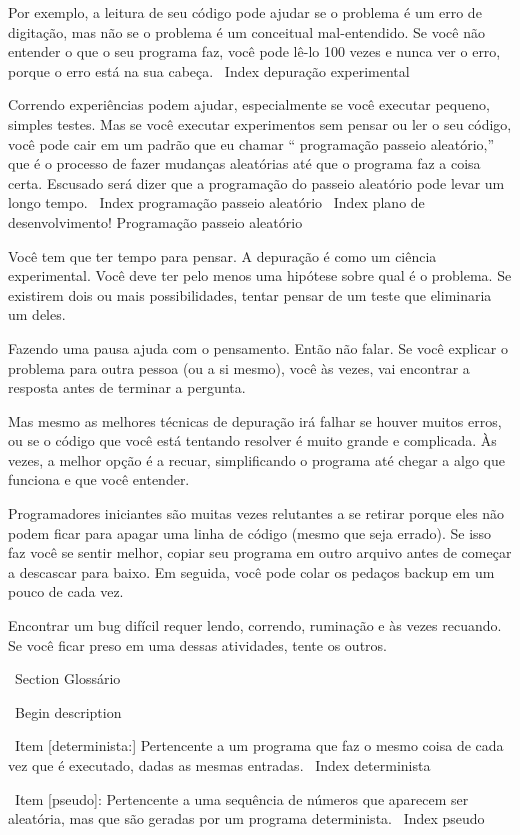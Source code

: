 \documentclass[10pt]{book}
\begin{document}
{{{{{{{{{{Por exemplo, a leitura de seu código pode ajudar se o problema é um
erro de digitação, mas não se o problema é um conceitual
mal-entendido. Se você não entender o que o seu programa faz, você
pode lê-lo 100 vezes e nunca ver o erro, porque o erro está na
sua cabeça.
\ Index {depuração experimental}

Correndo experiências podem ajudar, especialmente se você executar pequeno, simples
testes. Mas se você executar experimentos sem pensar ou ler o seu
código, você pode cair em um padrão que eu chamar `` programação passeio aleatório,''
que é o processo de fazer mudanças aleatórias até que o programa
faz a coisa certa. Escusado será dizer que a programação do passeio aleatório
pode levar um longo tempo.
\ Index {programação passeio aleatório}
\ Index {plano de desenvolvimento! Programação passeio aleatório}

Você tem que ter tempo para pensar. A depuração é como um
ciência experimental. Você deve ter pelo menos uma hipótese sobre
qual é o problema. Se existirem dois ou mais possibilidades, tentar
pensar de um teste que eliminaria um deles.

Fazendo uma pausa ajuda com o pensamento. Então não falar.
Se você explicar o problema para outra pessoa (ou a si mesmo), você
às vezes, vai encontrar a resposta antes de terminar a pergunta.

Mas mesmo as melhores técnicas de depuração irá falhar se houver muitos
erros, ou se o código que você está tentando resolver é muito grande e
complicada. Às vezes, a melhor opção é a recuar, simplificando o
programa até chegar a algo que funciona e que você
entender.

Programadores iniciantes são muitas vezes relutantes a se retirar porque
eles não podem ficar para apagar uma linha de código (mesmo que seja errado).
Se isso faz você se sentir melhor, copiar seu programa em outro arquivo
antes de começar a descascar para baixo. Em seguida, você pode colar os pedaços
backup em um pouco de cada vez.

Encontrar um bug difícil requer lendo, correndo, ruminação e
às vezes recuando. Se você ficar preso em uma dessas atividades,
tente os outros.


\ Section {} Glossário

\ Begin {description}

\ Item [determinista:] Pertencente a um programa que faz o mesmo
coisa de cada vez que é executado, dadas as mesmas entradas.
\ Index {} determinista

\ Item [pseudo]: Pertencente a uma sequência de números que aparecem
ser aleatória, mas que são geradas por um programa determinista.
\ Index {pseudo}

}}}}}}}}}}
\end{document}
